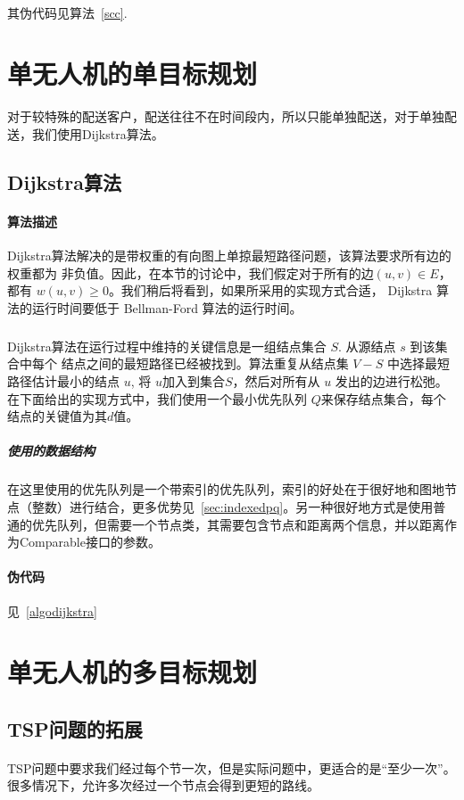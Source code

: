 \documentclass[UTF8,a4paper]{ctexart}
\begin{document}
\paragraph{}其伪代码见算法~\ref{scc}.


\section{单无人机的单目标规划}
对于较特殊的配送客户，配送往往不在时间段内，所以只能单独配送，对于单独配送，我们使用Dijkstra算法。
\subsection{Dijkstra算法}\label{sec:dijkstra}
\paragraph{算法描述}Dijkstra算法解决的是带权重的有向图上单掠最短路径问题，该算法要求所有边的权重都为 非负值。因此，在本节的讨论中，我们假定对于所有的边$(u,v)\in E$，都有 $w(u,v)\geq 0$。我们稍后将看到，如果所采用的实现方式合适， Dijkstra 算法的运行时间要低于 Bellman-Ford 算法的运行时间。
\subparagraph{}Dijkstra算法在运行过程中维持的关键信息是一组结点集合 {$S$}. 从源结点 {$s$} 到该集合中每个 结点之间的最短路径已经被找到。算法重复从结点集 $V-S$ 中选择最短路径估计最小的结点 $u$, 将 $u$加入到集合$S$，然后对所有从 $u$ 发出的边进行松弛。在下面给出的实现方式中，我们使用一个最小优先队列 $Q$来保存结点集合，每个结点的关键值为其$d$值。
\subparagraph{使用的数据结构}在这里使用的优先队列是一个带索引的优先队列，索引的好处在于很好地和图地节点（整数）进行结合，更多优势见~\ref{sec:indexedpq}。另一种很好地方式是使用普通的优先队列，但需要一个节点类，其需要包含节点和距离两个信息，并以距离作为Comparable接口的参数。
\paragraph{伪代码}见~\ref{algodijkstra}

\section{单无人机的多目标规划}
\subsection{TSP问题的拓展}\label{sec:tspEXT}
\paragraph{}TSP问题中要求我们经过每个节一次，但是实际问题中，更适合的是“至少一次”。很多情况下，允许多次经过一个节点会得到更短的路线。
\end{document}
